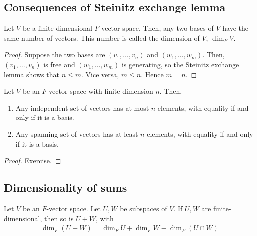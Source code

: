\subsection{Consequences of Steinitz exchange lemma}
\begin{corollary}
    Let $V$ be a finite-dimensional $F$-vector space.
    Then, any two bases of $V$ have the same number of vectors.
    This number is called the dimension of $V$, $\dim_F V$.
\end{corollary}
\begin{proof}
    Suppose the two bases are $(v_1, \dots, v_n)$ and $(w_1, \dots, w_m)$.
    Then, $(v_1, \dots, v_n)$ is free and $(w_1, \dots, w_m)$ is generating, so the Steinitz exchange lemma shows that $n \leq m$.
    Vice versa, $m \leq n$.
    Hence $m = n$.
\end{proof}
\begin{corollary}
    Let $V$ be an $F$-vector space with finite dimension $n$.
    Then,
    \begin{enumerate}
        \item Any independent set of vectors has at most $n$ elements, with equality if and only if it is a basis.
        \item Any spanning set of vectors has at least $n$ elements, with equality if and only if it is a basis.
    \end{enumerate}
\end{corollary}
\begin{proof}
    Exercise.
\end{proof}

\subsection{Dimensionality of sums}
\begin{proposition}
    Let $V$ be an $F$-vector space.
    Let $U, W$ be subspaces of $V$.
    If $U, W$ are finite-dimensional, then so is $U + W$, with
    \begin{align*}
        \dim_F (U + W) = \dim_F U + \dim_F W - \dim_F (U \cap W)
    \end{align*}
\end{proposition}

